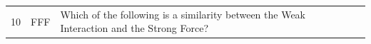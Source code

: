 \documentclass[10pt]{article}
\begin{document}
\begin{tiny}
\begin{longtable}{|r|p{0.375in}|p{1.275in}|p{3.5in}|}
10 &          FFF &                                                                                                                                                                                        Which of the following is a similarity between the Weak Interaction and the Strong Force? &                                                                                                                                                                                                                                                                                                                                                                                                                                                                                                                                                                                                                                                                                                                                                                                                                                                                                                                                                                                                                                                                                                                                                                                                                                                                                                                                                                                                                                                                                                                                                                                                                                                                                                                                                                                                                                                                                                                                                                                                                                                                                                                                                                                                                                                                                                                                                                                                                                                                                                                                                                                                                                                                                                                                                                                                                                                                                                                                                                                                                                                                                               
\end{longtable}
\end{tiny}
\end{document}
